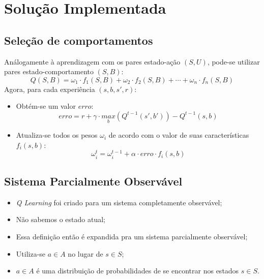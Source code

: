 \documentclass{beamer}
\begin{document}
\section{Solução Implementada}

\subsection{Seleção de comportamentos}

\begin{frame}
Análogamente à aprendizagem com os pares estado-ação $ \left( S, U \right) $, pode-se utilizar pares estado-comportamento $ \left( S, B \right) $:
$$ Q \left( S, B \right) = \omega_1 \cdot f_1 \left( S, B \right) + \omega_2 \cdot f_2 \left( S, B \right) + \cdots + \omega_n \cdot f_n \left( S, B \right) $$\pause
Agora, para cada experiência $ \left( s, b, s', r \right) $:\pause
\begin{itemize}
	\item Obtém-se um valor $ erro $:
		$$ erro = r + \gamma \cdot \underset{b}{max} \left( Q^{t-1} \left( s', b' \right) \right) - Q^{t-1} \left( s, b \right) $$\pause
	\item Atualiza-se todos os pesos $ \omega_i $ de acordo com o valor de suas características $ f_i \left( s, b \right) $:
		$$ \omega_i^t = \omega_i^{t-1} + \alpha \cdot erro \cdot f_i \left( s, b \right) $$
\end{itemize}
\end{frame}


\subsection{Sistema Parcialmente Observável}

\begin{frame}
\begin{itemize}
	\item \textit{Q Learning} foi criado para um sistema completamente observável;\pause
	\item Não sabemos o estado atual;\pause
	\item Essa definição então é expandida pra um sistema parcialmente observável;\pause
	\item Utiliza-se $ a \in A $ no lugar de $ s \in S $;\pause
	\item $ a \in A $ é uma distribuição de probabilidades de se encontrar nos estados $ s \in S $.
\end{itemize}
\end{frame}
\end{document}
